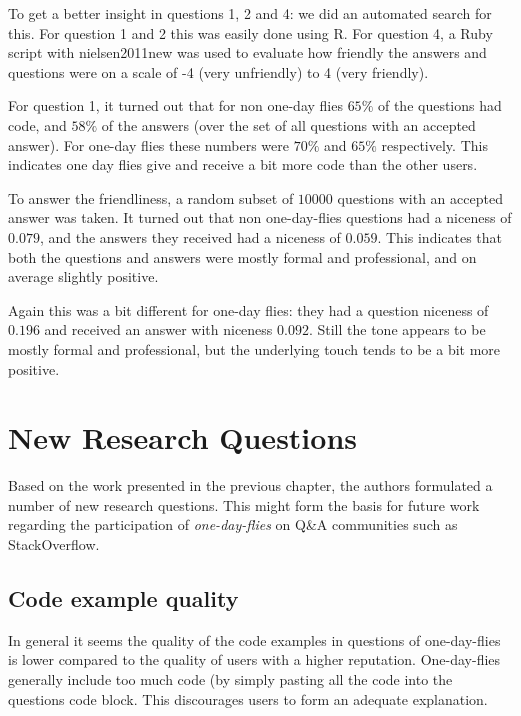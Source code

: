 \documentclass[conference]{IEEEtran}
\begin{document}
To get a better insight in questions 1, 2 and 4: we did an automated search for
this. For question 1 and 2 this was easily done using R. For question 4, a Ruby
script with nielsen2011new \cite{nielsen2011new} was used to evaluate how
friendly the answers and questions were on a scale of -4 (very unfriendly) to 4
(very friendly). 

For question 1, it turned out that for non one-day flies $65\%$ of the
questions had code, and $58\%$ of the answers (over the set of all questions
with an accepted answer). For one-day flies these numbers were $70\%$ and
$65\%$ respectively. This indicates one day flies give and receive a bit more
code than the other users.

To answer the friendliness, a random subset of $10000$ questions with an
accepted answer was taken. It turned out that non one-day-flies questions had a
niceness of $0.079$, and the answers they received had a niceness of $0.059$.
This indicates that both the questions and answers were mostly formal and
professional, and on average slightly positive.

Again this was a bit different for one-day flies: they had a question niceness
of $0.196$ and received an answer with niceness $0.092$. Still the tone appears
to be mostly formal and professional, but the underlying touch tends to be a
bit more positive.

\section{New Research Questions} \label{NewResearchQuestions}

Based on the work presented in the previous chapter, the authors formulated a
number of new research questions. This might form the basis for future work
regarding the participation of \textit{one-day-flies} on Q\&A communities such
as StackOverflow.

\subsection{Code example quality}

In general it seems the quality of the code examples in questions of
one-day-flies is lower compared to the quality of users with a higher
reputation. One-day-flies generally include too much code (by simply pasting
all the code into the questions code block. This discourages users to form an
adequate explanation.
\end{document}
